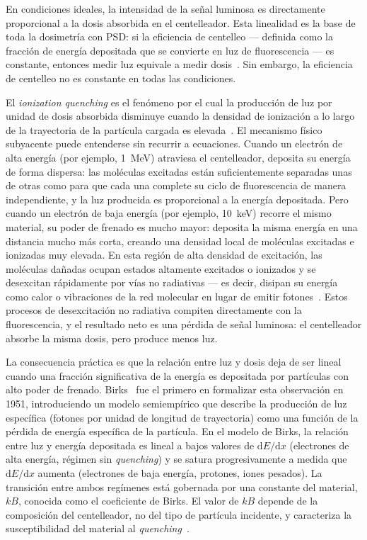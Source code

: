\documentclass[11pt,a4paper]{article}
\begin{document}
En condiciones ideales, la intensidad de la señal luminosa es directamente proporcional a la dosis absorbida en el centelleador. Esta linealidad es la base de toda la dosimetría con PSD: si la eficiencia de centelleo --- definida como la fracción de energía depositada que se convierte en luz de fluorescencia --- es constante, entonces medir luz equivale a medir dosis~\cite{beddar1992}. Sin embargo, la eficiencia de centelleo no es constante en todas las condiciones.

El \textit{ionization quenching} es el fenómeno por el cual la producción de luz por unidad de dosis absorbida disminuye cuando la densidad de ionización a lo largo de la trayectoria de la partícula cargada es elevada~\cite{birks1951}. El mecanismo físico subyacente puede entenderse sin recurrir a ecuaciones. Cuando un electrón de alta energía (por ejemplo, 1~MeV) atraviesa el centelleador, deposita su energía de forma dispersa: las moléculas excitadas están suficientemente separadas unas de otras como para que cada una complete su ciclo de fluorescencia de manera independiente, y la luz producida es proporcional a la energía depositada. Pero cuando un electrón de baja energía (por ejemplo, 10~keV) recorre el mismo material, su poder de frenado es mucho mayor: deposita la misma energía en una distancia mucho más corta, creando una densidad local de moléculas excitadas e ionizadas muy elevada. En esta región de alta densidad de excitación, las moléculas dañadas ocupan estados altamente excitados o ionizados y se desexcitan rápidamente por vías no radiativas --- es decir, disipan su energía como calor o vibraciones de la red molecular en lugar de emitir fotones~\cite{boivin2016}. Estos procesos de desexcitación no radiativa compiten directamente con la fluorescencia, y el resultado neto es una pérdida de señal luminosa: el centelleador absorbe la misma dosis, pero produce menos luz.

La consecuencia práctica es que la relación entre luz y dosis deja de ser lineal cuando una fracción significativa de la energía es depositada por partículas con alto poder de frenado. Birks~\cite{birks1951} fue el primero en formalizar esta observación en 1951, introduciendo un modelo semiempírico que describe la producción de luz específica (fotones por unidad de longitud de trayectoria) como una función de la pérdida de energía específica de la partícula. En el modelo de Birks, la relación entre luz y energía depositada es lineal a bajos valores de $\mathrm{d}E/\mathrm{d}x$ (electrones de alta energía, régimen sin \textit{quenching}) y se satura progresivamente a medida que $\mathrm{d}E/\mathrm{d}x$ aumenta (electrones de baja energía, protones, iones pesados). La transición entre ambos regímenes está gobernada por una constante del material, $kB$, conocida como el coeficiente de Birks. El valor de $kB$ depende de la composición del centelleador, no del tipo de partícula incidente, y caracteriza la susceptibilidad del material al \textit{quenching}~\cite{boivin2016}.
\end{document}
